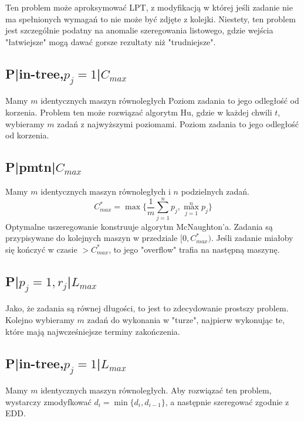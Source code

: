 \documentclass{../notatki}
\begin{document}
Ten problem może aproksymować LPT, z modyfikacją w której jeśli zadanie nie ma
spełnionych wymagań to nie może być zdjęte z kolejki. Niestety, ten problem
jest szczególnie podatny na anomalie szeregowania listowego, gdzie wejścia
"łatwiejsze" mogą dawać gorsze rezultaty niż "trudniejsze".

\subsection{P|in-tree,\texorpdfstring{$p_j =
1$}{pj=1}|\texorpdfstring{$C_{max}$}{Cmax}}

Mamy $m$ identycznych maszyn równoległych
Poziom zadania to jego odległość od korzenia. Problem ten może rozwiązać
algorytm Hu, gdzie w każdej chwili $t$, wybieramy $m$ zadań z najwyższymi
poziomami. Poziom zadania to jego odległość od korzenia.

\subsection{P|pmtn|\texorpdfstring{$C_{max}$}{Cmax}}

Mamy $m$ identycznych maszyn równoległych i $n$ podzielnych zadań.
$$
C^*_{max} = \max\{\frac{1}{m}\sum_{j=1}^n p_j, \max_{j=1}^n p_j\}
$$
Optymalne uszeregowanie konstruuje algorytm McNaughton'a. Zadania są
przypisywane do kolejnych maszyn w przedziale $[0, C^*_{max})$. Jeśli zadanie
miałoby się kończyć w czasie $> C^*_{max}$, to jego "overflow" trafia na
następną maszynę.

\subsection{P|\texorpdfstring{$p_j=1,r_j$}{pj=1,rj}|\texorpdfstring{$L_{max}$}{Lmax}}

Jako, że zadania są równej długości, to jest to zdecydowanie prostszy
problem. Kolejno wybieramy $m$ zadań do wykonania w "turze", najpierw wykonując
te, które mają najwcześniejsze terminy zakończenia.

\subsection{P|in-tree,\texorpdfstring{$p_j =
1$}{pj=1}|\texorpdfstring{$L_{max}$}{Lmax}}

Mamy $m$ identycznych maszyn równoległych. Aby rozwiązać ten problem,
wystarczy zmodyfkować $d_i = \min\{d_i, d_{i - 1}\}$, a następnie
szeregować zgodnie z EDD.
\end{document}
